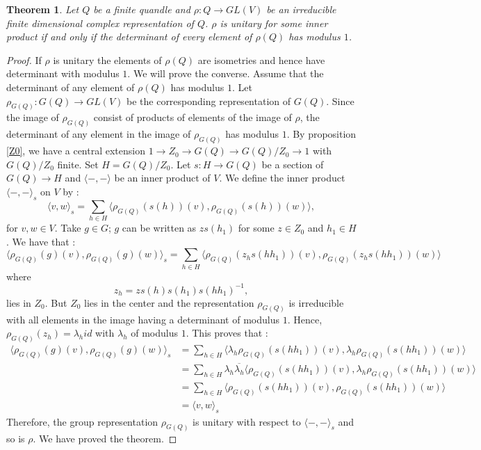 \documentclass[10pt,a4paper]{amsart}
\newtheorem{theorem}{Theorem}
\begin{document}
\begin{theorem}
Let $Q$ be a finite quandle and $\rho : Q \to GL(V)$ be an irreducible finite dimensional complex representation of $Q$. $\rho$ is unitary for some inner product if and only if the determinant of every element of $\rho(Q)$ has modulus $1$.
\end{theorem}

\begin{proof}
If $\rho$ is unitary the elements of $\rho(Q)$ are isometries and hence have determinant with modulus $1$. We will prove the converse. Assume that the determinant of any element of $\rho(Q)$ has modulus $1$. Let $\rho_{G(Q)} : G(Q) \to GL(V)$ be the corresponding representation of $G(Q)$. Since the image of $\rho_{G(Q)}$ consist of products of elements of the image of $\rho$, the determinant of any element in the image of $\rho_{G(Q)}$ has modulus $1$. By proposition \ref{Z0}, we have a central extension $1 \to Z_0 \to G(Q) \to G(Q)/Z_0\to 1$ with $G(Q)/Z_0$ finite. Set $H=G(Q)/Z_0$. Let $s:H\to G(Q)$ be a section of $G(Q)\to H$ and $\langle-,-\rangle$ be an inner product of $V$. We define the inner product $\langle -,-\rangle_s$ on $V$ by :
$$ \langle v,w\rangle_s= \sum_{h\in H} \langle \rho_{G(Q)}(s(h))(v), \rho_{G(Q)}(s(h))(w)\rangle,$$
for $v,w\in V$. Take $g \in G$; $g$ can be written as $zs(h_1)$ for some $z\in Z_0$ and $h_1\in H$. We have that :
$$ \langle \rho_{G(Q)}(g)(v),\rho_{G(Q)}(g)(w)\rangle_s= \sum_{h\in H} \langle \rho_{G(Q)}(z_hs(hh_1))(v), \rho_{G(Q)}(z_hs(hh_1))(w)\rangle$$
where 
$$ z_h=zs(h)s(h_1)s(hh_1)^{-1},$$
lies in $Z_0$. But $Z_0$ lies in the center and the representation $\rho_{G(Q)}$ is irreducible with all elements in the image having a determinant of modulus $1$. Hence, $\rho_{G(Q)}(z_h)=\lambda_h id$ with $\lambda_h$ of modulus $1$. This proves that  :
\begin{equation*}
 \begin{split}
\langle \rho_{G(Q)}(g)(v),\rho_{G(Q)}(g)(w)\rangle_s  & = \sum_{h\in H} \langle \lambda_h\rho_{G(Q)}(s(hh_1))(v), \lambda_h\rho_{G(Q)}(s(hh_1))(w)\rangle\\
&=\sum_{h\in H}\lambda_h\overline{\lambda_h} \langle \rho_{G(Q)}(s(hh_1))(v), \lambda_h\rho_{G(Q)}(s(hh_1))(w)\rangle\\
&=\sum_{h\in H} \langle \rho_{G(Q)}(s(hh_1))(v), \rho_{G(Q)}(s(hh_1))(w)\rangle\\
&= \langle v,w\rangle_s
\end{split}
\end{equation*}
Therefore, the group representation $\rho_{G(Q)}$ is unitary with respect to $\langle -,-\rangle_s$ and so is $\rho$. We have proved the theorem.
\end{proof}
\end{document}
